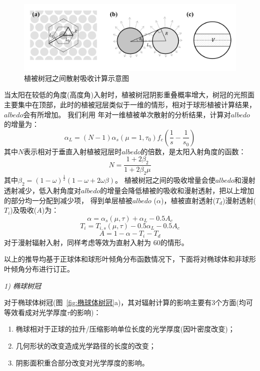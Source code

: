 {
\begin{figure}[]
\centering
\includegraphics[width=0.95\columnwidth]{Figures/辐射过程及辐射通量计算/散射吸收计算示意图.png}
\caption{植被树冠之间散射吸收计算示意图}
\label{fig:散射吸收计算示意图}
\end{figure}
}

当太阳在较低的角度(高度角)入射时，植被树冠阴影重叠概率增大，树冠的光照面主要集中在顶部，此时的植被冠层类似于一维的情形，相对于球形植被计算结果，$albedo$会有所增加。
我们利用 \citet{dickinson1983land} 年对一维植被单次散射的分析结果，计算对$albedo$的增量为：
\begin{equation}
\alpha_{L}=(N-1) \alpha_{s}\left(\mu=1, \tau_{0}\right) f_{c}\left(\frac{1}{s}-\frac{1}{s_{0}}\right)
\end{equation}
其中$N$表示相对于垂直入射植被冠层时$albedo$的倍数，是太阳入射角度的函数：
\begin{equation}
N=\frac{1+2 \beta_{2}}{1+2 \beta_{2} \mu}
\end{equation}
其中$\beta_2=\left(1-\omega\right)^\frac{1}{2}(1-\omega+2\omega\beta)$。
植被树冠之间的吸收增量会使$albedo$和漫射透射减少，低入射角度对$albedo$的增量会降低植被的吸收和漫射透射，把以上增加的部分均一分配到减少项，
得到单层植被$albedo$ ($\alpha$)，植被直射透射($T_d$)漫射透射($T_i$)及吸收($A$)为：
\begin{equation}
\alpha=\alpha_{s}(\mu, \tau)+\alpha_{L}-0.5 A_{c}
\end{equation}
\begin{equation}
T_{i}=T_{i, s}(\mu, \tau)-0.5 \alpha_{L}-0.5 A_{c}
\end{equation}
\begin{equation}
A=1-\alpha-T_{i}-T_{d}
\end{equation}
对于漫射辐射入射，同样考虑等效为直射入射为 60\textdegree 的情形。

以上的推导均基于正球体和球形叶倾角分布函数情况下，下面将对椭球体和非球形叶倾角分布进行订正。

\textit{1) 椭球树冠}

对于椭球体树冠(图~\ref{fig:椭球体树冠}a)，其对辐射计算的影响主要有3个方面(均可等效看成对光学厚度$\tau$的影响)：
\begin{enumerate}
    \item 椭球相对于正球的拉升/压缩影响单位长度的光学厚度(因叶密度改变)；
    \item 几何形状的改变造成光学路径的长度的改变；
    \item 阴影面积重合部分改变对光学厚度的影响。
\end{enumerate}

